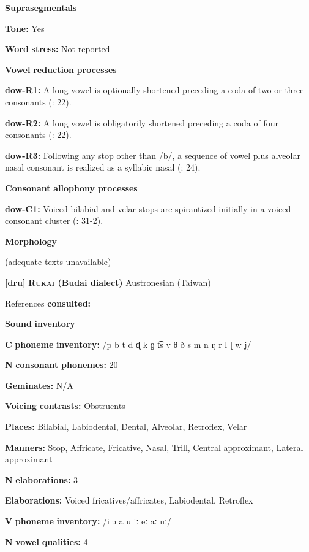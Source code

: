 \textbf{Suprasegmentals}

\textbf{Tone:} Yes

\textbf{Word} \textbf{stress:} Not reported

\textbf{Vowel} \textbf{reduction} \textbf{processes}

\textbf{dow-R1:} A long vowel is optionally shortened preceding a coda of two or three consonants (\citealt{WieringWiering1994}: 22).

\textbf{dow-R2:} A long vowel is obligatorily shortened preceding a coda of four consonants (\citealt{WieringWiering1994}: 22).

\textbf{dow-R3:} Following any stop other than /b/, a sequence of vowel plus alveolar nasal consonant is realized as a syllabic nasal (\citealt{WieringWiering1994}: 24).

\textbf{Consonant} \textbf{allophony} \textbf{processes}

\textbf{dow-C1:} Voiced bilabial and velar stops are spirantized initially in a voiced consonant cluster (\citealt{WieringWiering1994}: 31-2).

\textbf{Morphology}

(adequate texts unavailable)

\textbf{[dru]}   \textbf{\textsc{Rukai} \textbf{(Budai} \textbf{dialect)}  }Austronesian (Taiwan)

References \textbf{consulted:} \citet{Chen2006}

\textbf{Sound} \textbf{inventory}

\textbf{C} \textbf{phoneme} \textbf{inventory:} /p b t d ɖ k ɡ t͡s v θ ð s m n ŋ r l ɭ w j/

\textbf{N} \textbf{consonant} \textbf{phonemes:} 20

\textbf{Geminates:} N/A

\textbf{Voicing} \textbf{contrasts:} Obstruents

\textbf{Places:} Bilabial, Labiodental, Dental, Alveolar, Retroflex, Velar

\textbf{Manners:} Stop, Affricate, Fricative, Nasal, Trill, Central approximant, Lateral approximant

\textbf{N} \textbf{elaborations:} 3

\textbf{Elaborations:} Voiced fricatives/affricates, Labiodental, Retroflex

\textbf{V} \textbf{phoneme} \textbf{inventory:} /i ə a u iː eː aː uː/

\textbf{N} \textbf{vowel} \textbf{qualities:} 4

